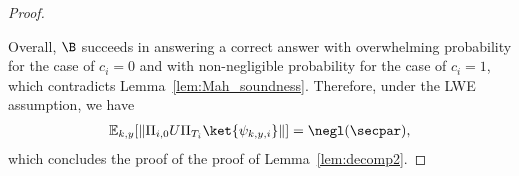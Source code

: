 \begin{proof}
\begin{itemize}
\end{itemize}

Overall, $\B$ succeeds in answering a correct answer with overwhelming probability for the case of $c_i=0$ and with non-negligible probability for the case of $c_i=1$, which contradicts Lemma~\ref{lem:Mah_soundness}.
Therefore, under the LWE assumption, we have
\begin{align*}
   \mathbb{E}_{k,y}[\|\Pi_{i,0}U\Pi_{T_i}\ket{\psi_{k,y,i}}\|]=\negl(\secpar), 
\end{align*}
which concludes the proof of the proof of Lemma~\ref{lem:decomp2}.





\end{proof}

